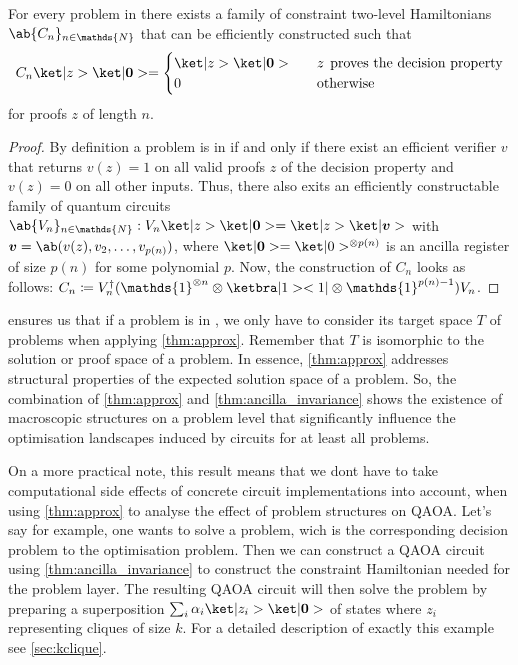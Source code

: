\begin{theorem}
    \label{thm:ancilla_invariance}
    For every problem in \NP there exists a family of constraint two-level Hamiltonians $\ab\{C_n\}_{n \in \mathds{N}}$ that can be efficiently constructed such that 
    \begin{equation}
        C_n\ket|z>\ket|\bm{0}> = \begin{cases}
            \ket|z>\ket|\bm{0}> &\quad z \:\:\text{proves the decision property} \\
            0                       &\quad \text{otherwise}
        \end{cases}
    \end{equation}
    for proofs $z$ of length $n$.
\end{theorem}

\begin{proof}
    By definition a problem is in \NP if and only if there exist an efficient verifier $v$ that returns $v(z) = 1$ on all valid proofs $z$ of the decision property and $v(z) = 0$ on all other inputs. Thus, there also exits an efficiently constructable family of quantum circuits $\ab\{V_n\}_{n \in \mathds{N}} : V_n \ket|z>\ket|\bm{0}> = \ket|z>\ket|\bm{v}>$ with $\bm{v} = \ab(v(z), v_2, \dots, v_{p(n)})$, where $\ket|\bm{0}> = \ket|0>^{\otimes p(n)}$ is an ancilla register of size $p(n)$ for some polynomial $p$. Now, the construction of $C_n$ looks as follows: $C_n \coloneqq V_n^\dagger (\mathds{1}^{\otimes n} \otimes \ketbra|1><1| \otimes \mathds{1}^{p(n) - 1}) V_n$.
\end{proof}

\begin{remark}
     ensures us that if a problem is in \NP, we only have to consider its target space $T$ of problems when applying \cref{thm:approx}. Remember that $T$ is isomorphic to the solution or proof space of a problem. In essence, \cref{thm:approx} addresses structural properties of the expected solution space of a problem. So, the combination of \cref{thm:approx} and \cref{thm:ancilla_invariance} shows the existence of macroscopic structures on a problem level that significantly influence the optimisation landscapes induced by \QAOA circuits for at least all \NP problems. 
\end{remark}

On a more practical note, this result means that we dont have to take computational side effects of concrete circuit implementations into account, when using \cref{thm:approx} to analyse the effect of problem structures on QAOA. Let's say for example, one wants to solve a \kclique problem, wich is the corresponding decision problem to the \maxclique optimisation problem. Then we can construct a QAOA circuit using \cref{thm:ancilla_invariance} to construct the constraint Hamiltonian needed for the problem layer. The resulting QAOA circuit will then solve the \kclique problem by preparing a superposition $\sum_i \alpha_i \ket|z_i>\ket|\bm{0}>$ of states where $z_i$ representing cliques of size $k$. For a detailed description of exactly this example see \cref{sec:kclique}.

